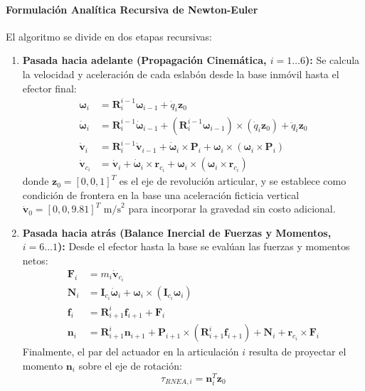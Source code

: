\documentclass[12pt]{article}
\begin{document}
\paragraph{Formulación Analítica Recursiva de Newton-Euler}
El algoritmo se divide en dos etapas recursivas:
\begin{enumerate}
    \item \textbf{Pasada hacia adelante (Propagación Cinemática, $i = 1 \dots 6$):} Se calcula la velocidad y aceleración de cada eslabón desde la base inmóvil hasta el efector final:
    \begin{align}
        \bm{\omega}_i &= \bm{R}_i^{i-1} \bm{\omega}_{i-1} + \dot{q}_i \bm{z}_0 \label{eq:rnea_w} \\
        \dot{\bm{\omega}}_i &= \bm{R}_i^{i-1} \dot{\bm{\omega}}_{i-1} + (\bm{R}_i^{i-1} \bm{\omega}_{i-1}) \times (\dot{q}_i \bm{z}_0) + \ddot{q}_i \bm{z}_0 \label{eq:rnea_dw} \\
        \dot{\bm{v}}_i &= \bm{R}_i^{i-1} \dot{\bm{v}}_{i-1} + \dot{\bm{\omega}}_i \times \bm{P}_i + \bm{\omega}_i \times (\bm{\omega}_i \times \bm{P}_i) \label{eq:rnea_dv_m2} \\
        \dot{\bm{v}}_{c_i} &= \dot{\bm{v}}_i + \dot{\bm{\omega}}_i \times \bm{r}_{c_i} + \bm{\omega}_i \times (\bm{\omega}_i \times \bm{r}_{c_i}) \label{eq:rnea_dvcom_m2}
    \end{align}
    donde $\bm{z}_0 = [0, 0, 1]^T$ es el eje de revolución articular, y se establece como condición de frontera en la base una aceleración ficticia vertical $\dot{\bm{v}}_0 = [0, 0, 9.81]^T\text{ m/s}^2$ para incorporar la gravedad sin costo adicional.
    
    \item \textbf{Pasada hacia atrás (Balance Inercial de Fuerzas y Momentos, $i = 6 \dots 1$):} Desde el efector hasta la base se evalúan las fuerzas y momentos netos:
    \begin{align}
        \bm{F}_i &= m_i \dot{\bm{v}}_{c_i} \label{eq:rnea_f_in} \\
        \bm{N}_i &= \bm{I}_{c_i} \dot{\bm{\omega}}_i + \bm{\omega}_i \times (\bm{I}_{c_i} \bm{\omega}_i) \label{eq:rnea_n_in} \\
        \bm{f}_i &= \bm{R}_{i+1}^i \bm{f}_{i+1} + \bm{F}_i \label{eq:rnea_f_bal} \\
        \bm{n}_i &= \bm{R}_{i+1}^i \bm{n}_{i+1} + \bm{P}_{i+1} \times (\bm{R}_{i+1}^i \bm{f}_{i+1}) + \bm{N}_i + \bm{r}_{c_i} \times \bm{F}_i \label{eq:rnea_n_bal}
    \end{align}
    Finalmente, el par del actuador en la articulación $i$ resulta de proyectar el momento $\bm{n}_i$ sobre el eje de rotación:
    \begin{equation}
        \tau_{RNEA, i} = \bm{n}_i^T \bm{z}_0
        \label{eq:rnea_tau_m2}
    \end{equation}
\end{enumerate}
\end{document}
